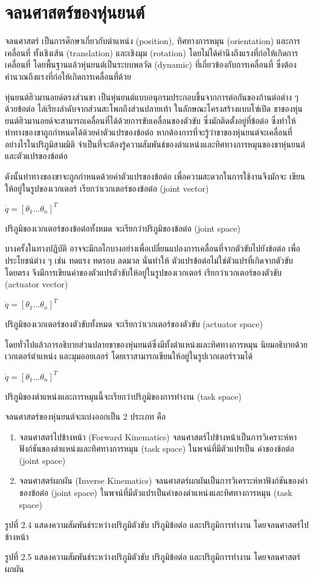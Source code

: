 \section{จลนศาสตร์ของหุ่นยนต์}
จลนศาสตร์ เป็นการศึกษาเกี่ยวกับตำแหน่ง (position), ทิศทางการหมุน (orientation) และการเคลื่อนที่ 
ทั้งเชิงเส้น (translation) และเชิงมุม (rotation) โดยไม่ได้คำนึงถึงแรงที่ก่อให้เกิดการเคลื่อนที่ 
โดยพื้นฐานแล้วหุ่นยนต์เป็นระบบพลวัต (dynamic) ที่เกี่ยวข้องกับการเคลื่อนที่ 
ซึ่งต้องคำนวณถึงแรงที่ก่อให้เกิดการเคลื่อนที่ด้วย
\par
หุ่นยนต์ฮิวมานอยด์ตรงส่วนขา เป็นหุ่นยนต์แบบอนุกรมประกอบขึ้นจากการต่อกันของก้านต่อต่าง ๆด้วยข้อต่อ
ไล่เรียงลำดับจากส่วนสะโพกถึงส่วนปลายเท้า ในลักษณะโครงสร้างแบบโซ่เปิด
ขาของหุ่นยนต์ฮิวมานอยด์จะสามารถเคลื่อนที่ได้ด้วยการขับเคลื่อนของตัวขับ ซึ่งมักติดตั้งอยู่ที่ข้อต่อ 
ซึ่งทำให้ท่าทางของขาถูกกำหนดได้ด้วยค่าตัวแปรของข้อต่อ หากต้องการที่จะรู้ว่าขาของหุ่นยนต์จะเคลื่อนที่
อย่างไรในปริภูมิสามมิติ จำเป็นที่จะต้องรู้ความสัมพันธ์ของตำแหน่งและทิศทางการหมุนของขาหุ่นยนต์ 
และตัวแปรของข้อต่อ
\par
ดังนั้นท่าทางของขาจะถูกกำหนดด้วยค่าตัวแปรของข้อต่อ เพื่อความสะดวกในการใช้งานจึงมักจะ
เขียนให้อยู่ในรูปของเวกเตอร์ เรียกว่าเวกเตอร์ของข้อต่อ (joint vector)

$\dot{q}=[\theta_1 ... \theta_n ]^T$

ปริภูมิของเวกเตอร์ของข้อต่อทั้งหมด จะเรียกว่าปริภูมิของข้อต่อ (joint space)
\par
บางครั้งในทางปฏิบัติ อาจจะมีกลไกบางอย่างเพื่อเปลี่ยนแปลงการเคลื่อนที่จากตัวขับไปยังข้อต่อ 
เพื่อประโยชน์ต่าง ๆ เช่น ทดแรง ทดรอบ ลดมวล นั่นทำให้ ตัวแปรข้อต่อไม่ใช่ตัวแปรที่เกิดจากตัวขับโดยตรง 
จึงมีการเขียนค่าของตัวแปรตัวขับให้อยู่ในรูปของเวกเตอร์ เรียกว่าเวกเตอร์ของตัวขับ (actuator vector)

$\dot{q}=[\theta_1 ... \theta_n ]^T$

ปริภูมิของเวกเตอร์ของตัวขับทั้งหมด จะเรียกว่าเวกเตอร์ของตัวขับ (actuator space)
\par
โดยทั่วไปแล้วการอธิบายส่วนปลายขาของหุ่นยนต์ซึ่งมีทั้งตำแหน่งและทิศทางการหมุน 
นิยมอธิบายด้วยเวกเตอร์ตำแหน่ง และมุมออยเลอร์ โดยเราสามารถเขียนให้อยู่ในรูปเวกเตอร์รวมได้

$\dot{q}=[\theta_1 ... \theta_n ]^T$

ปริภูมิของตำแหน่งและการหมุนนี้จะเรียกว่าปริภูมิของการทำงาน (task space)

จลนศาสตร์ของหุ่นยนต์จะแบ่งออกเป็น 2 ประเภท คือ
\begin{enumerate}[label=\thesection.\arabic*, leftmargin=1.5cm]
	\item จลนศาสตร์ไปข้างหน้า (Forward Kinematics)
จลนศาสตร์ไปข้างหน้าเป็นการวิเคราะห์หาฟังก์ชันของตำแหน่งและทิศทางการหมุน (task space) ในพจน์ที่มีตัวแปรเป็น ค่าของข้อต่อ (joint space)
    \item จลนศาสตร์ผกผัน (Inverse Kinematics)
จลนศาสตร์ผกผันเป็นการวิเคราะห์หาฟังก์ชันของค่าของข้อต่อ (joint space) ในพจน์ที่มีตัวแปรเป็นค่าของตำแหน่งและทิศทางการหมุน (task space)
\end{enumerate}

รูปที่ 2.4 แสดงความสัมพันธ์ระหว่างปริภูมิตัวขับ ปริภูมิข้อต่อ และปริภูมิการทำงาน โดยจลนศาสตร์ไปข้างหน้า


รูปที่ 2.5 แสดงความสัมพันธ์ระหว่างปริภูมิตัวขับ ปริภูมิข้อต่อ และปริภูมิการทำงาน โดยจลนศาสตร์ผกผัน